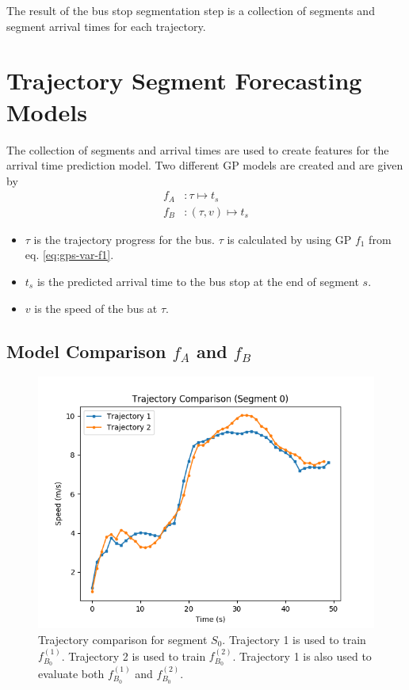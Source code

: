 The result of the bus stop segmentation step is a collection of segments and segment arrival times for each trajectory.

\section{Trajectory Segment Forecasting Models}
The collection of segments and arrival times are used to create features for the arrival time prediction model.
Two different GP models are created and are given by
\begin{align}
    f_A&: \tau \mapsto t_s \label{eq:f_A} \\
    f_B&: (\tau, v) \mapsto t_s \label{eq:f_B}
\end{align}
\begin{itemize}
    \item $\tau$ is the trajectory progress for the bus. $\tau$ is calculated by using GP $f_1$ from eq. \ref{eq:gps-var-f1}.
    \item $t_s$ is the predicted arrival time to the bus stop at the end of segment $s$.
    \item $v$ is the speed of the bus at $\tau$. 
\end{itemize}  

\subsection{Model Comparison $f_A$ and $f_B$}
\begin{figure}[t]  
    \centering 
    \includegraphics[width=\textwidth]{figures/speed_fB_comparison}
    \caption[ Trajectory comparison for segment $S_0$ ]%
    {{\small Trajectory comparison for segment $S_0$.
    Trajectory 1 is used to train $f^{(1)}_{B_0}$.
    Trajectory 2 is used to train $f^{(2)}_{B_0}$.
    Trajectory 1 is also used to evaluate both $f^{(1)}_{B_0}$ and $f^{(2)}_{B_0}$.}}   
    \label{fig:trajectory-comparison-s0}
\end{figure}

